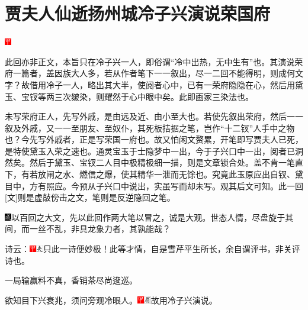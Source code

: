 

\chapter{贾夫人仙逝扬州城\hspace{.5em}冷子兴演说荣国府}
\includegraphics[width=3mm]{../Images/00002}{\kaishu 此回亦非正文，本旨只在冷子兴一人，即俗谓``冷中出热，无中生有''也。其演说荣府一篇者，盖因族大人多，若从作者笔下一一叙出，尽一二回不能得明，则成何文字？故借用冷子一人，略出其大半，使阅者心中，已有一荣府隐隐在心，然后用黛玉、宝钗等两三次皴染，则耀然于心中眼中矣。此即画家三染法也。


未写荣府正人，先写外戚，是由远及近、由小至大也。若使先叙出荣府，然后一一叙及外戚，又一一至朋友、至奴仆，其死板拮据之笔，岂作``十二钗''人手中之物也？今先写外戚者，正是写荣国一府也。故又怕闲文赘累，开笔即写贾夫人已死，是特使黛玉入荣之速也。通灵宝玉于士隐梦中一出，今于子兴口中一出，阅者已洞然矣。然后于黛玉、宝钗二人目中极精极细一描，则是文章锁合处。盖不肯一笔直下，有若放闸之水、燃信之爆，使其精华一泄而无馀也。究竟此玉原应出自钗、黛目中，方有照应。今预从子兴口中说出，实虽写而却未写。观其后文可知。此一回{[}文{]}则是虚敲傍击之文，笔则是反逆隐回之笔。

\includegraphics[width=3mm]{../Images/00005}以百回之大文，先以此回作两大笔以冒之，诚是大观。世态人情，尽盘旋于其间，而一丝不乱，非具龙象力者，其孰能哉？}

诗云：{\includegraphics[width=3mm]{../Images/00002}\includegraphics[width=3mm]{../Images/00012}\footnotesize \kaishu 只此一诗便妙极！此等才情，自是雪芹平生所长，余自谓评书，非关评诗也。}

一局输赢料不真，香销茶尽尚逡巡。

欲知目下兴衰兆，须问旁观冷眼人。{\includegraphics[width=3mm]{../Images/00002}\includegraphics[width=3mm]{../Images/00010}\footnotesize \kaishu 故用冷子兴演说。}

